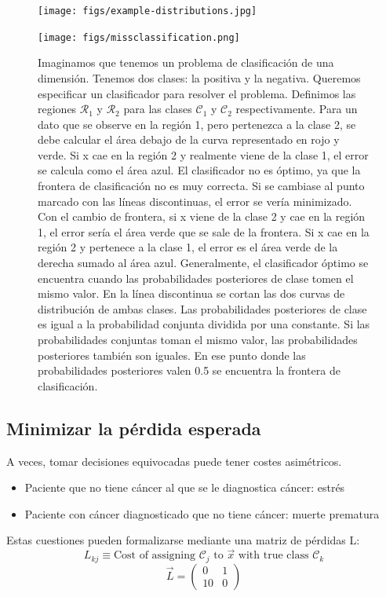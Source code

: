 \begin{figure}[h]
\centering
\texttt{[image: figs/example-distributions.jpg]}
\end{figure}

\begin{figure}[h]
\centering
\texttt{[image: figs/missclassification.png]}
\caption{Imaginamos que tenemos un problema de clasificación de una dimensión. Tenemos dos clases: la positiva y la negativa. Queremos especificar un clasificador para resolver el problema. Definimos las regiones $\mathcal{R}_1$ y $\mathcal{R}_2$ para las clases $\mathcal{C}_1$ y $\mathcal{C}_2$ respectivamente. Para un dato que se observe en la región 1, pero pertenezca a la clase 2, se debe calcular el área debajo de la curva representado en rojo y verde. Si x cae en la región 2 y realmente viene de la clase 1, el error se calcula como el área azul. El clasificador no es óptimo, ya que la frontera de clasificación no es muy correcta. Si se cambiase al punto marcado con las líneas discontinuas, el error se vería minimizado. Con el cambio de frontera, si x viene de la clase 2 y cae en la región 1, el error sería el área verde que se sale de la frontera. Si x cae en la región 2 y pertenece a la clase 1, el error es el área verde de la derecha sumado al área azul. Generalmente, el clasificador óptimo se encuentra cuando las probabilidades posteriores de clase tomen el mismo valor. En la línea discontinua se cortan las dos curvas de distribución de ambas clases. Las probabilidades posteriores de clase es igual a la probabilidad conjunta dividida por una constante. Si las probabilidades conjuntas toman el mismo valor, las probabilidades posteriores también son iguales. En ese punto donde las probabilidades posteriores valen 0.5 se encuentra la frontera de clasificación.}
\end{figure}

\subsection{Minimizar la pérdida esperada}
A veces, tomar decisiones equivocadas puede tener costes asimétricos.
\begin{itemize}
\item Paciente que no tiene cáncer al que se le diagnostica cáncer: estrés
\item Paciente con cáncer diagnosticado que no tiene cáncer: muerte prematura
\end{itemize}
Estas cuestiones pueden formalizarse mediante una matriz de pérdidas L:
$$L_{kj} \equiv \text{Cost of assigning } \mathcal{C}_j \text{ to } \vec{x} \text{ with true class } \mathcal{C}_k$$
$$\vec{L} = \begin{pmatrix}
0 & 1 \\ 10 & 0
\end{pmatrix}$$

